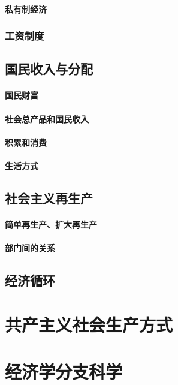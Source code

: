 \documentclass[UTF8]{../../RepresentationUniverse}
\begin{document}
        \subsubsection{私有制经济}
    \subsection{工资制度}
\section{国民收入与分配}
    \subsubsection{国民财富}
    \subsubsection{社会总产品和国民收入}
    \subsubsection{积累和消费}
    \subsubsection{生活方式}
\section{社会主义再生产}
    \subsubsection{简单再生产、扩大再生产}
    \subsubsection{部门间的关系}
\section{经济循环}



\chapter{共产主义社会生产方式}



\chapter{经济学分支科学}
\end{document}
